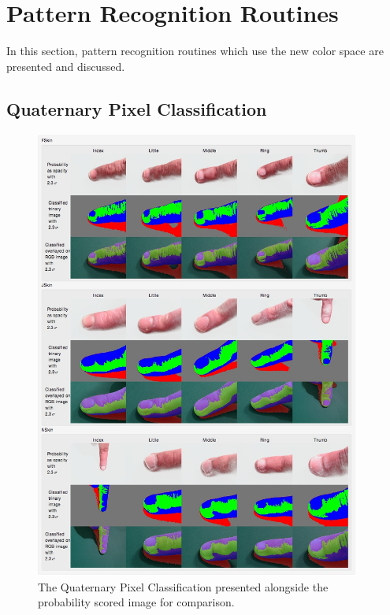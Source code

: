 \section{Pattern Recognition Routines}\label{sec:PatternRecognitionRoutines}
In this section, pattern recognition routines which use the new color space are presented and discussed.

\subsection{Quaternary Pixel Classification}\label{sec:QuaternaryPixelClassification}

\newcommand{\WoBoBool}{\underset{\scalebox{0.5}{WoBo}}{\mathbb{L}}}
\newcommand{\ColorSquareBool}{\underset{ \scalebox{0.5}[0.5]{square} }{ \mathbb{C} } }
\newcommand{\ColorEllipseBool}{\underset{ \scalebox{0.5}[0.5]{ellipse} }{ \mathbb{C} } }

\begin{figure}[h!]
  \centering
    \includegraphics[width=0.95\textwidth]{Chapter4/Figs/ClassifiedSkin.jpg}
    \caption{The Quaternary Pixel Classification presented alongside the probability scored image for comparison.}\label{fig:2BitImage}
\end{figure}

